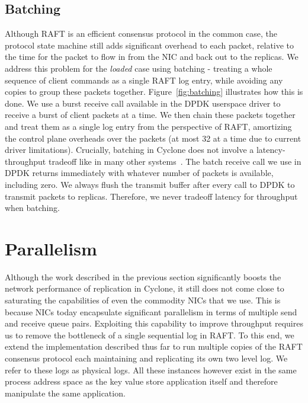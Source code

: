 \documentclass[pageno]{jpaper}
\begin{document}
\subsection{Batching}

Although RAFT is an efficient consensus protocol in the common case, the
protocol state machine still adds significant overhead to each packet, relative
to the time for the packet to flow in from the NIC and back out to the replicas.
We address this problem for the \emph{loaded} case using batching - treating a
whole sequence of client commands as a single RAFT log entry, while avoiding any
copies to group these packets together. Figure~\ref{fig:batching} illustrates
how this is done. We use a burst receive call available in the DPDK userspace
driver to receive a burst of client packets at a time. We then chain these
packets together and treat them as a single log entry from the perspective of
RAFT, amortizing the control plane overheads over the packets (at most 32 at a
time due to current driver limitations). Crucially, batching in Cyclone does not
involve a latency-throughput tradeoff like in many other
systems~\cite{ix-dataplane}. The batch receive call we use in DPDK returns
immediately with whatever number of packets is available, including zero. We
always flush the transmit buffer after every call to DPDK to transmit packets to
replicas. Therefore, we never tradeoff latency for throughput when batching. 

\section{Parallelism}
\label{sec:parallelism}


Although the work described in the previous section significantly boosts the
network performance of replication in Cyclone, it still does not come close to
saturating the capabilities of even the commodity NICs that we use. This is
because NICs today encapsulate significant parallelism in terms of
multiple send and receive queue pairs. Exploiting this capability to improve
throughput requires us to remove the bottleneck of a single sequential log in
RAFT. To this end, we extend the implementation described thus far to run
multiple copies of the RAFT consensus protocol each maintaining and replicating
its own two level log. We refer to these logs as physical logs. All these
instances however exist in the same process address space as the key value store
application itself and therefore manipulate the same application.
\end{document}
